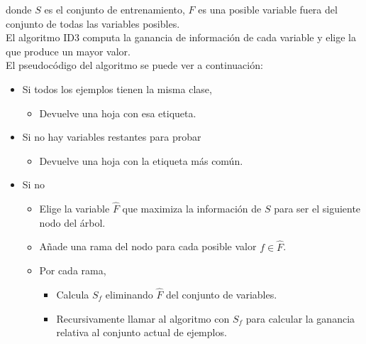 donde $S$ es el conjunto de entrenamiento, $F$ es una posible variable fuera del conjunto de todas las variables posibles.\\

El algoritmo ID3 computa la ganancia de información de cada variable y elige la que produce un mayor valor.\\

El pseudocódigo del algoritmo se puede ver a continuación:

\begingroup
\myfont
\begin{itemize}
\item Si todos los ejemplos tienen la misma clase,

\begin{itemize}
\item Devuelve una hoja con esa etiqueta.
\end{itemize}

\item Si no hay variables restantes para probar

\begin{itemize}
\item Devuelve una hoja con la etiqueta más común.
\end{itemize}

\item Si no

\begin{itemize}
\item Elige la variable $\hat{F}$ que maximiza la información de $S$ para ser el siguiente nodo del árbol.
\item Añade una rama del nodo para cada posible valor $f \in \hat{F}$.
\item Por cada rama,

\begin{itemize}
\item Calcula $S_f$ eliminando $\hat{F}$ del conjunto de variables.
\item Recursivamente llamar al algoritmo con $S_f$ para calcular la ganancia relativa al conjunto actual de ejemplos.
\end{itemize}

\end{itemize}

\end{itemize}
\endgroup

